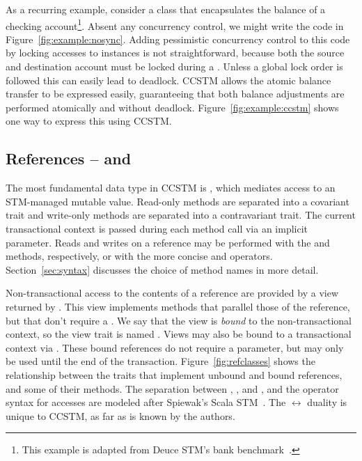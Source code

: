 



As a recurring example, consider a class that encapsulates the balance of
a checking account\footnote{This example is adapted from Deuce STM's bank
benchmark~\cite{deucestm}.}.  Absent any concurrency control, we might
write the code in Figure~\ref{fig:example:nosync}.  Adding pessimistic
concurrency control to this code by locking accesses to 
instances is not straightforward, because both the source and destination
account must be locked during a .  Unless a global lock
order is followed this can easily lead to deadlock.  CCSTM allows the
atomic balance transfer to be expressed easily, guaranteeing that both
balance adjustments are performed atomically and without deadlock.
Figure~\ref{fig:example:ccstm} shows one way to express this using CCSTM.


\subsection{References --  and }

The most fundamental data type in CCSTM is , which mediates
access to an STM-managed mutable value.  Read-only methods are separated into a
covariant  trait and write-only methods are separated into a
contravariant  trait.  The current transactional context is passed
during
each method call via an implicit parameter.  Reads and writes on a
reference may be performed with the  and  methods,
respectively, or with the more concise  and \code{:=}
operators.  Section~\ref{sec:syntax} discusses
the choice of method names in more detail.

Non-transactional access to the contents of a reference are provided by a view
returned by .  This view implements methods that parallel those of
the reference, but that don't require a .  We say that the view
is \textit{bound} to the non-transactional context, so the view trait is
named .  Views may also be bound to a transactional context
via .  These bound references do not require a 
parameter, but may only be used until the end of the transaction.
Figure~\ref{fig:refclasses} shows the
 relationship between the traits that implement unbound
and bound references, and some of their methods.  The separation between
, , and , and the operator syntax for
accesses are modeled after Spiewak's Scala STM~\cite{github:spiewak}.
The  $ \leftrightarrow $  duality is unique
to CCSTM, as far as is known by the authors.

